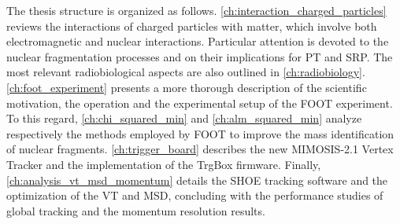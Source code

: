 The thesis structure is organized as follows. \autoref{ch:interaction_charged_particles} reviews the interactions of charged particles with matter, which involve both electromagnetic and nuclear interactions. Particular attention is devoted to the nuclear fragmentation processes and on their implications for PT and SRP. The most relevant radiobiological aspects are also outlined in \autoref{ch:radiobiology}. \autoref{ch:foot_experiment} presents a more thorough description of the scientific motivation, the operation and the experimental setup of the FOOT experiment. To this regard, \autoref{ch:chi_squared_min} and \autoref{ch:alm_squared_min} analyze respectively the methods employed by FOOT to improve the mass identification of nuclear fragments. \autoref{ch:trigger_board} describes the new MIMOSIS-2.1 Vertex Tracker and the implementation of the TrgBox firmware. Finally, \autoref{ch:analysis_vt_msd_momentum} details the SHOE tracking software and the optimization of the VT and MSD, concluding with the performance studies of global tracking and the momentum resolution results.